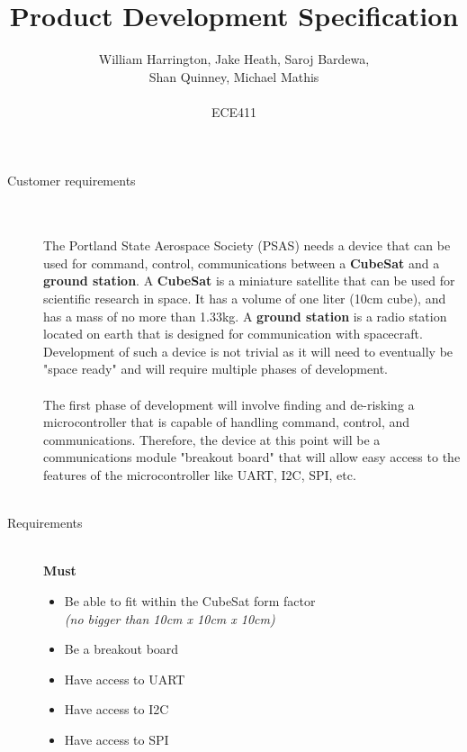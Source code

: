 \documentclass[12pt]{article}
\begin{document}
\title{Product Development Specification}%
\author{William Harrington, Jake Heath, Saroj Bardewa,\\ Shan Quinney, Michael Mathis\\ \\ %
ECE411} %
 
\maketitle
 \small
\begin{description} 
	\item[Customer requirements] \hfill \\ \\
		The Portland State Aerospace Society (PSAS) needs a device that can be used for command, control, communications between a \textbf{CubeSat} and a \textbf{ground station}.
		A \textbf{CubeSat} is a miniature satellite that can be used for scientific research in space. It has a volume of one liter (10cm cube), and has a mass of no more than 1.33kg. 
		A \textbf{ground station} is a radio station located on earth that is designed for communication with spacecraft.
		Development of such a device is not trivial as it will need to eventually be "space ready" and will require multiple phases of development. \hfill \\ \\
		The first phase of development will involve finding and de-risking a microcontroller that is capable of handling command, control, and communications. 
		Therefore, the device at this point will be a communications module "breakout board" that will allow easy access to the features of the microcontroller like UART, I2C, SPI, etc. 
		\hfill \\ \\
		\newpage
	\item[Requirements] \hfill \\
		\textbf{Must}
		\begin{itemize}
			\item{Be able to fit within the CubeSat form factor\\ \textit{(no bigger than 10cm x 10cm x 10cm)}}
			\item{Be a breakout board}
			\item{Have access to UART}
			\item{Have access to I2C}
			\item{Have access to SPI}

\end{itemize}
\end{description}
\end{document}
